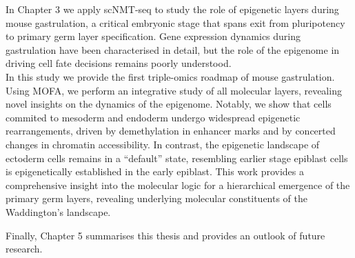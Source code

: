 In Chapter 3 we apply scNMT-seq to study the role of epigenetic layers during mouse gastrulation, a critical embryonic stage that spans exit from pluripotency to primary germ layer specification. Gene expression dynamics during gastrulation have been characterised in detail, but the role of the epigenome in driving cell fate decisions remains poorly understood.\\
In this study we provide the first triple-omics roadmap of mouse gastrulation. Using MOFA, we perform an integrative study of all molecular layers, revealing novel insights on the dynamics of the epigenome. Notably, we show that cells commited to mesoderm and endoderm undergo widespread epigenetic rearrangements, driven by demethylation in enhancer marks and by concerted changes in chromatin accessibility. In contrast, the epigenetic landscape of ectoderm cells remains in a “default” state, resembling earlier stage epiblast cells is epigenetically established in the early epiblast. This work provides a comprehensive insight into the molecular logic for a hierarchical emergence of the primary germ layers, revealing underlying molecular constituents of the Waddington's landscape.


Finally, Chapter 5 summarises this thesis and provides an outlook of future research.